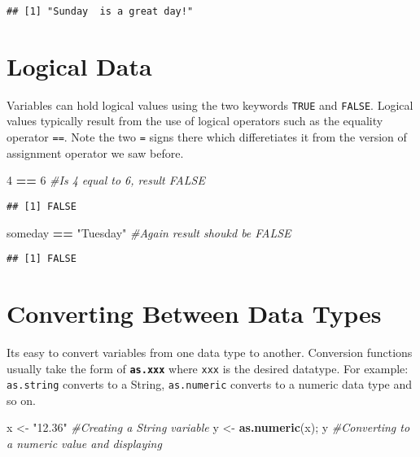 \documentclass[
]{krantz}
\makeatletter
\newenvironment{Shaded}{\begin{snugshade}}{\end{snugshade}}
\newcommand{\CommentTok}[1]{\textcolor[rgb]{0.37,0.37,0.37}{\textit{#1}}}
\newcommand{\DecValTok}[1]{\textcolor[rgb]{0.06,0.06,0.06}{#1}}
\newcommand{\KeywordTok}[1]{\textcolor[rgb]{0.27,0.27,0.27}{\textbf{#1}}}
\newcommand{\NormalTok}[1]{#1}
\newcommand{\OperatorTok}[1]{\textcolor[rgb]{0.43,0.43,0.43}{\textbf{#1}}}
\newcommand{\StringTok}[1]{\textcolor[rgb]{0.5,0.5,0.5}{#1}}
\newenvironment{kframe}{%
\medskip{}
\setlength{\fboxsep}{.8em}
 \def\at@end@of@kframe{}%
 \ifinner\ifhmode%
  \def\at@end@of@kframe{\end{minipage}}%
  \begin{minipage}{\columnwidth}%
 \fi\fi%
 \def\FrameCommand##1{\hskip\@totalleftmargin \hskip-\fboxsep
 \colorbox{shadecolor}{##1}\hskip-\fboxsep
     \hskip-\linewidth \hskip-\@totalleftmargin \hskip\columnwidth}%
 \MakeFramed {\advance\hsize-\width
   \@totalleftmargin\z@ \linewidth\hsize
   \@setminipage}}%
 {\par\unskip\endMakeFramed%
 \at@end@of@kframe}
\renewenvironment{Shaded}{\begin{kframe}}{\end{kframe}}
\makeatother
\begin{document}
\begin{verbatim}
## [1] "Sunday  is a great day!"
\end{verbatim}

\hypertarget{logical-data}{%
\section{Logical Data}\label{logical-data}}

Variables can hold logical values using the two keywords \texttt{TRUE} and \texttt{FALSE}. Logical values typically result from the use of logical operators such as the equality operator \texttt{==}. Note the two \texttt{=} signs there which differetiates it from the version of assignment operator we saw before.

\begin{Shaded}
\begin{Highlighting}[]
\DecValTok{4} \OperatorTok{==}\StringTok{ }\DecValTok{6} \CommentTok{#Is 4 equal to 6, result FALSE}
\end{Highlighting}
\end{Shaded}

\begin{verbatim}
## [1] FALSE
\end{verbatim}

\begin{Shaded}
\begin{Highlighting}[]
\NormalTok{someday }\OperatorTok{==}\StringTok{ "Tuesday"} \CommentTok{#Again result shoukd be FALSE}
\end{Highlighting}
\end{Shaded}

\begin{verbatim}
## [1] FALSE
\end{verbatim}

\hypertarget{converting-between-data-types}{%
\section{Converting Between Data Types}\label{converting-between-data-types}}

Its easy to convert variables from one data type to another. Conversion functions usually take the form of \textbf{\texttt{as.xxx}} where \texttt{xxx} is the desired datatype. For example: \texttt{as.string} converts to a String, \texttt{as.numeric} converts to a numeric data type and so on.

\begin{Shaded}
\begin{Highlighting}[]
\NormalTok{x <-}\StringTok{ "12.36"} \CommentTok{#Creating a String variable}
\NormalTok{y <-}\StringTok{ }\KeywordTok{as.numeric}\NormalTok{(x); y }\CommentTok{#Converting to a numeric value and displaying}
\end{Highlighting}
\end{Shaded}
\end{document}
